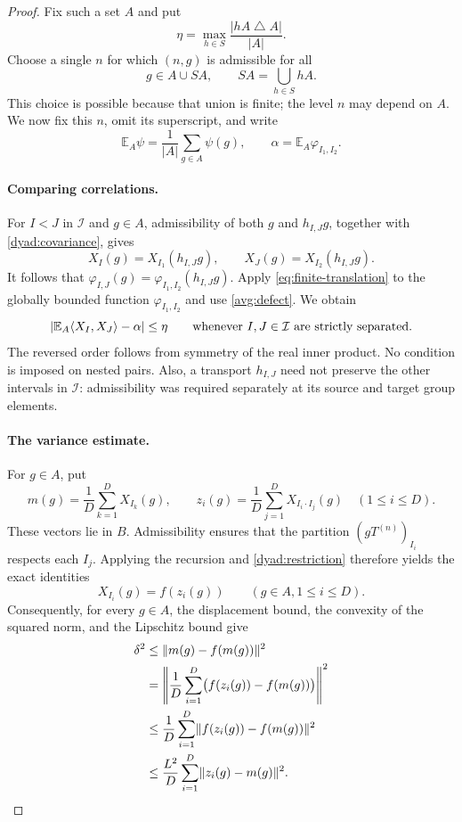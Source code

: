 \begin{proof}
Fix such a set $A$ and put
\begin{equation}\label{avg:defect}
  \eta=\max_{h\in S}\frac{|hA\mathbin{\triangle}A|}{|A|}.
\end{equation}
Choose a single $n$ for which $(n,g)$ is admissible for all
\[
  g\in A\cup SA,
  \qquad SA=\bigcup_{h\in S}hA.
\]
This choice is possible because that union is finite; the level $n$
may depend on $A$.  We now fix this $n$, omit its superscript, and write
\[
  \mathbb E_A\psi=\frac1{|A|}\sum_{g\in A}\psi(g),
  \qquad
  \alpha=\mathbb E_A\varphi_{I_1,I_2}.
\]
\paragraph{Comparing correlations.}
For $I<J$ in $\mathcal I$ and $g\in A$, admissibility of both $g$
and $h_{I,J}g$, together with \eqref{dyad:covariance}, gives
\[
  X_I(g)=X_{I_1}(h_{I,J}g),\qquad
  X_J(g)=X_{I_2}(h_{I,J}g).
\]
It follows that $\varphi_{I,J}(g)
=\varphi_{I_1,I_2}(h_{I,J}g)$.  Apply
\eqref{eq:finite-translation} to the globally bounded function
$\varphi_{I_1,I_2}$ and use \eqref{avg:defect}.  We obtain
\begin{equation}\label{avg:correlation}
  \left|\mathbb E_A\langle X_I,X_J\rangle-\alpha\right|
       \leq\eta
  \qquad\text{whenever $I,J\in\mathcal I$ are strictly separated}.
\end{equation}
The reversed order follows from symmetry of the real inner
product.  No condition is imposed on nested pairs.  Also, a
transport $h_{I,J}$ need not preserve the other intervals in
$\mathcal I$: admissibility was required separately at its source
and target group elements.

\paragraph{The variance estimate.}

For $g\in A$, put
\[
  m(g)=\frac1D\sum_{k=1}^D X_{I_k}(g),\qquad
  z_i(g)=\frac1D\sum_{j=1}^D X_{I_i\cdot I_j}(g)
       \quad(1\leq i\leq D).
\]
These vectors lie in $B$.  Admissibility ensures that the partition
$(gT^{(n)})_{I_i}$ respects each $I_j$.  Applying the recursion and
\eqref{dyad:restriction} therefore yields the exact identities
\begin{equation}\label{avg:recursive-identity}
  X_{I_i}(g)=f(z_i(g))\qquad(g\in A, 1\leq i\leq D).
\end{equation}
Consequently, for every $g\in A$, the displacement bound, the
convexity of the squared norm, and the Lipschitz bound give
\begin{align}
  \delta^2
  &\leq\lVert m(g)-f(m(g))\rVert^2\notag\\
  &=\left\|\frac1D\sum_{i=1}^D
                   \bigl(f(z_i(g))-f(m(g))\bigr)\right\|^2\notag\\
  &\leq\frac1D\sum_{i=1}^D
                   \lVert f(z_i(g))-f(m(g))\rVert^2\notag\\
  &\leq\frac{L^2}{D}\sum_{i=1}^D\lVert z_i(g)-m(g)\rVert^2.
       \label{avg:displacement}
\end{align}


\end{proof}

